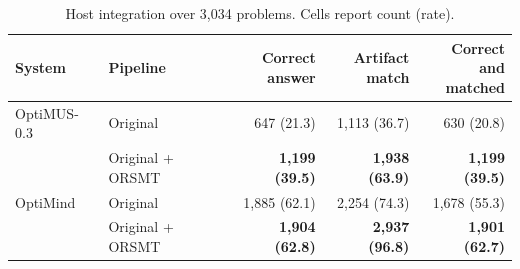 \begin{table}[htbp]
\caption{Host integration over 3,034 problems. Cells report count (rate).}
\label{tab:plugincomparison}
\centering
\footnotesize
\setlength{\tabcolsep}{3.0pt}
\begin{tabular*}{\textwidth}{@{\extracolsep{\fill}}llrrr@{}}
\toprule
System & Pipeline & \shortstack{Correct\\answer} &
\shortstack{Artifact\\match} & \shortstack{Correct and\\matched}\\
\midrule
OptiMUS-0.3 & Original & 647 (21.3) & 1,113 (36.7) & 630 (20.8)\\
 & Original + ORSMT & \textbf{1,199 (39.5)} & \textbf{1,938 (63.9)} & \textbf{1,199 (39.5)}\\
\midrule
OptiMind & Original & 1,885 (62.1) & 2,254 (74.3) & 1,678 (55.3)\\
 & Original + ORSMT & \textbf{1,904 (62.8)} & \textbf{2,937 (96.8)} & \textbf{1,901 (62.7)}\\
\bottomrule
\end{tabular*}
\end{table}
